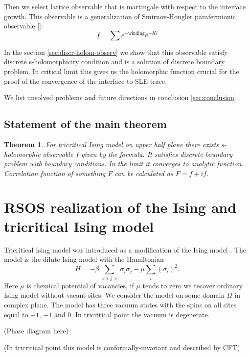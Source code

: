 \documentclass[12pt]{article}
\newtheorem{theorem}{Theorem}
\begin{document}
 Then we
select lattice observable that is martingale with respect to the interface growth.
This observable is a generalization of Smirnov-Hongler parafermionic observable []:
\begin{equation}
  \label{eq:3}
  f = \sum e^{-\mbox{winding}} e^{-Kl}
\end{equation}

In the section \ref{sec:discr-holom-observ} we show that this observable satisfy discrete s-holomorphicity
condition and is a solution of discrete boundary problem. In critical limit this gives us the
holomorphic function crucial for the proof of the convergence of the interface to SLE trace.

We list unsolved problems and future directions in conclusion \ref{sec:conclusion}.

\subsection{Statement of the main theorem}
\label{sec:results}

\begin{theorem}
  For tricritical Ising model on upper half plane there exists s-holomorphic observable $f$ given by the
  formula. It satisfies discrete boundary problem with boundary conditions. In the limit it
  converges to analytic function. Correlation function of something $F$ can be calculated as $F=f+if$.
\end{theorem}
\section{RSOS realization of the Ising and tricritical Ising model}
\label{sec:rsos-real-ising}

Tricritical Ising model was introduced as a modification of the Ising model \cite{}. The model is
the dilute Ising model with the Hamiltonian 
\begin{equation}
  \label{eq:1}
  H = -\beta \sum_{<i,j>}\sigma_i\sigma_j - \mu \sum_{i}(\sigma_i)^2.
\end{equation}
Here $\mu$ is chemical potential of vacancies,
if $\mu$ tends to zero we recover ordinary Ising model without vacant sites. We consider the model on some domain
$\Omega$ in complex plane. The model has three vacuum states with the spins on all sites equal to
$+1$, $-1$ and $0$. In tricritical point the vacuum is degenerate. 

(Phase diagram here)

(In tricritical point this model is conformally-invariant and described by CFT)
\end{document}
